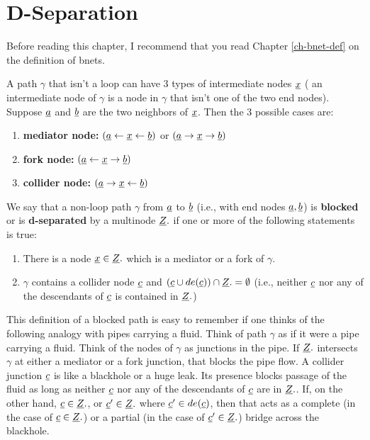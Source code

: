 \chapter{D-Separation}
\label{chap-dsep}
Before reading this chapter,
I  recommend
that you
read
Chapter \ref{ch-bnet-def}
on the definition of bnets.


A path $\gamma$ that
isn't a loop can have 
3 types of intermediate nodes ${\underline{x}}$ (
an intermediate node of $\gamma$
 is a node in $\gamma$ that 
isn't one
of the two end nodes).
Suppose ${\underline{a}}$ and ${\underline{b}}$
are the two neighbors of ${\underline{x}}$. Then
the 3 possible cases are:
\begin{enumerate}
\item {\bf mediator node:}
$({\underline{a}}\leftarrow{\underline{x}}\leftarrow {\underline{b}})$
or
$({\underline{a}}\rightarrow{\underline{x}}\rightarrow {\underline{b}})$
\item {\bf fork node:}
$({\underline{a}}\leftarrow{\underline{x}}\rightarrow {\underline{b}})$
\item {\bf collider node:}
$({\underline{a}}\rightarrow{\underline{x}}\leftarrow {\underline{b}})$
\end{enumerate}

We say that a non-loop path 
$\gamma$ 
from ${\underline{a}}$ to ${\underline{b}}$ (i.e., with
end nodes ${\underline{a}}, {\underline{b}}$)
is {\bf blocked} 
or is {\bf d-separated}
by a multinode ${\underline{Z}}.$
if one or more 
of the following
statements is true:

\begin{enumerate}
\item 
There is a node ${\underline{x}}\in {\underline{Z}}.$
which is a mediator 
or a fork of $\gamma$.
\item
$\gamma$ contains a collider
node ${\underline{c}}$
and 
$({\underline{c}}\cup de({\underline{c}}))\cap{\underline{Z}}.=\emptyset$
(i.e., neither 
${\underline{c}}$ nor 
any of the descendants of ${\underline{c}}$
is contained in ${\underline{Z}}.$)
\end{enumerate}

This definition of a blocked 
path is easy to remember
if one thinks 
of the following analogy
with pipes carrying a fluid.
Think of path
$\gamma$ as if it
were a pipe
carrying a fluid.
Think of
the nodes 
of $\gamma$ as junctions in the pipe.
If ${\underline{Z}}.$
intersects $\gamma$
at either a mediator
or a fork junction,
that blocks the pipe flow.
A collider junction ${\underline{c}}$
is like a blackhole 
or a huge leak.
Its presence
blocks passage
of the fluid
as long
as neither
${\underline{c}}$
nor any of
the descendants 
of ${\underline{c}}$
are in ${\underline{Z}}.$.
If,
on the 
other hand,
${\underline{c}}\in{\underline{Z}}.$,
or ${\underline{c}}'\in {\underline{Z}}.$
where ${\underline{c}}'\in de({\underline{c}})$,
then
that acts
as a complete
(in the case of ${\underline{c}}\in{\underline{Z}}.$)
or a partial 
(in the case of ${\underline{c}}'\in{\underline{Z}}.$)
bridge across the blackhole.

